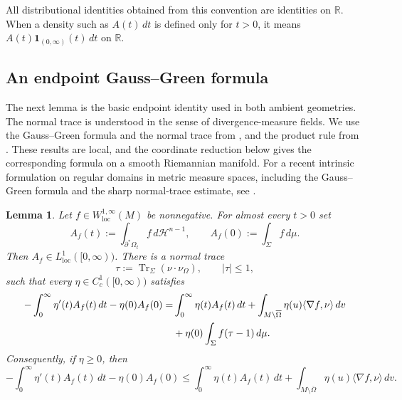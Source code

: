 \documentclass[11pt,reqno]{amsart}
\numberwithin{equation}{section}
\newtheorem{lemma}[theorem]{Lemma}
\theoremstyle{definition}
\newcommand{\calH}{\mathcal H}
\begin{document}
All distributional identities obtained from this convention are identities on $\mathbb R$.  When a density such as $A(t)\,dt$ is defined only for $t>0$, it means $A(t)\mathbf 1_{(0,\infty)}(t)\,dt$ on $\mathbb R$.

\subsection{An endpoint Gauss--Green formula}\label{subsec:endpoint-GG}

The next lemma is the basic endpoint identity used in both ambient geometries.  The normal trace is understood in the sense of divergence-measure fields.  We use the Gauss--Green formula and the normal trace from \cite[Theorem~2.2]{ChenFrid1999}, and the product rule from \cite[Theorem~3.1]{ChenFrid1999}.  These results are local, and the coordinate reduction below gives the corresponding formula on a smooth
Riemannian manifold.  For a recent intrinsic formulation on regular
domains in metric measure spaces, including the Gauss--Green formula
and the sharp normal-trace estimate, see \cite[Theorem~3.6]{GornyMazon2024}.

\begin{lemma}\label{lem:endpoint-transport}
Let $f\in W^{1,\infty}_{\mathrm{loc}}(M)$ be nonnegative.  For almost every $t>0$ set
\begin{equation*}
    A_f(t):=\int_{\partial^*\Omega_t}f\,d\calH^{n-1},
    \qquad
    A_f(0):=\int_\Sigma f\,d\mu.
\end{equation*}
Then $A_f\in L^1_{\mathrm{loc}}([0,\infty))$.  There is a normal trace
\begin{equation*}
    \tau:=\operatorname{Tr}_\Sigma(\nu\cdot\nu_\Omega),
    \qquad |\tau|\leq1,
\end{equation*}
such that every $\eta\in C_c^1([0,\infty))$ satisfies
\begin{align}
    -\int_0^\infty\eta'(t)A_f(t)\,dt-\eta(0)A_f(0)
    =&\int_0^\infty\eta(t)A_f(t)\,dt 
      +\int_{M\setminus\overline\Omega}\eta(u)\langle\nabla f,\nu\rangle\,dv \notag\\
    &+\eta(0)\int_\Sigma f(\tau-1)\,d\mu.\label{eq:endpoint-transport-exact}
\end{align}
Consequently, if $\eta\geq0$, then
\begin{equation}\label{eq:endpoint-transport-ineq}
    -\int_0^\infty\eta'(t)A_f(t)\,dt-\eta(0)A_f(0)
    \leq
    \int_0^\infty\eta(t)A_f(t)\,dt
    +\int_{M\setminus\overline\Omega}\eta(u)\langle\nabla f,\nu\rangle\,dv.
\end{equation}
\end{lemma}
\end{document}
